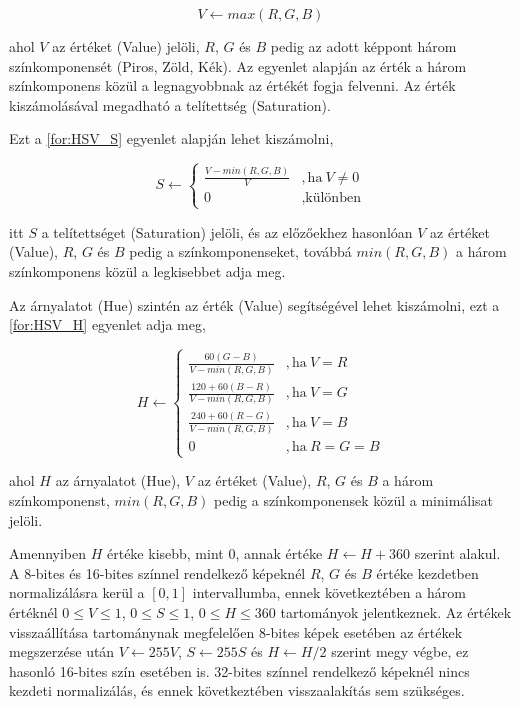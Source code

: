 \begin{equation}
    V \leftarrow max(R,G,B)
    \label{for:HSV_V}
\end{equation}

\par ahol $V$ az értéket (Value) jelöli, $R$, $G$ és $B$ pedig az adott képpont három színkomponensét (Piros, Zöld, Kék). Az egyenlet alapján az érték a három színkomponens közül a legnagyobbnak az értékét fogja felvenni. Az érték kiszámolásával megadható a telítettség (Saturation).
\par Ezt a \ref{for:HSV_S} egyenlet\cite{opencv_docs} alapján lehet kiszámolni,

\begin{equation}
    S \leftarrow
    \begin{cases}
        \frac{V-min(R,G,B)}{V} & ,\text{ha}\ V\neq0 \\
        0 & ,\text{különben}
    \end{cases}
    \label{for:HSV_S}
\end{equation}

\par itt $S$ a telítettséget (Saturation) jelöli, és az előzőekhez hasonlóan $V$ az értéket (Value), $R$, $G$ és $B$ pedig a színkomponenseket, továbbá $min(R,G,B)$ a három színkomponens közül a legkisebbet adja meg.
\par Az árnyalatot (Hue) szintén az érték (Value) segítségével lehet kiszámolni, ezt a \ref{for:HSV_H} egyenlet\cite{opencv_docs} adja meg,

\begin{equation}
    H \leftarrow
    \begin{cases}
        \frac{60(G-B)}{V-min(R,G,B)} & ,\text{ha}\ V=R \\[5pt]
        \frac{120+60(B-R)}{V-min(R,G,B)} & ,\text{ha}\ V=G \\[5pt]
        \frac{240+60(R-G)}{V-min(R,G,B)} & ,\text{ha}\ V=B \\[5pt]
        0 & ,\text{ha}\ R=G=B
    \end{cases}
    \label{for:HSV_H}
\end{equation}

\par ahol $H$ az árnyalatot (Hue), $V$ az értéket (Value), $R$, $G$ és $B$ a három színkomponenst, $min(R,G,B)$ pedig a színkomponensek közül a minimálisat jelöli.
\par Amennyiben $H$ értéke kisebb, mint $0$, annak értéke $H \leftarrow H+360$ szerint alakul. A 8-bites és 16-bites színnel rendelkező képeknél $R$, $G$ és $B$ értéke kezdetben normalizálásra kerül a $[0,1]$ intervallumba, ennek következtében a három értéknél $0 \le V \le 1$, $0 \le S \le 1$, $0 \le H \le 360$ tartományok jelentkeznek. Az értékek visszaállítása tartománynak megfelelően 8-bites képek esetében az értékek megszerzése után $V \leftarrow 255V$, $S \leftarrow 255S$ és $H \leftarrow H/2$ szerint megy végbe, ez hasonló 16-bites szín esetében is. 32-bites színnel rendelkező képeknél nincs kezdeti normalizálás, és ennek következtében visszaalakítás sem szükséges.\cite{opencv_docs}

